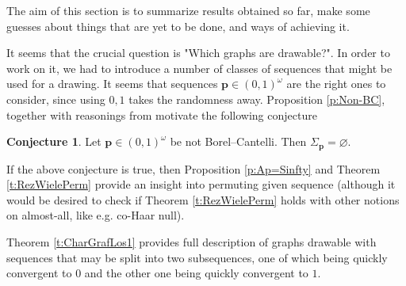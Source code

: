 \documentclass{amsart}
\theoremstyle{plain}
\theoremstyle{definition}
\newtheorem{con}[theorem]{Conjecture}
\theoremstyle{remark}
\numberwithin{equation}{section}
\begin{document}
The aim of this section is to summarize results obtained so far, make some guesses about things that are yet to be done, and ways of achieving it. 

It seems that the crucial question is "Which graphs are drawable?". In order to work on it, we had to introduce a number of classes of sequences that might be used for a drawing. It seems that sequences $\textbf{p}\in(0,1)^\omega$ are the right ones to consider, since using $0,1$ takes the randomness away. Proposition \ref{p:Non-BC}, together with reasonings from \cite{coregliano2024random} motivate the following conjecture
\begin{con}
    Let $\textbf{p}\in(0,1)^\omega$ be not Borel--Cantelli. Then $\Sigma_{\mathbf{p}}=\varnothing$.
\end{con}
If the above conjecture is true, then Proposition \ref{p:Ap=Sinfty} and Theorem \ref{t:RezWielePerm} provide an insight into permuting given sequence (although it would be desired to check if Theorem \ref{t:RezWielePerm} holds with other notions on almost-all, like e.g. co-Haar null). 

Theorem \ref{t:CharGrafLos1} provides full description of graphs drawable with sequences that may be split into two subsequences, one of which being quickly convergent to $0$ and the other one being quickly convergent to $1$. 
\end{document}
